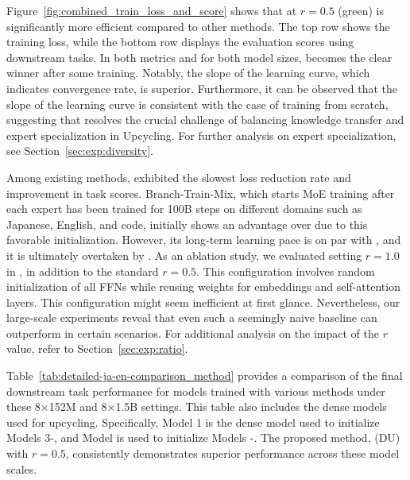 Figure~\ref{fig:combined_train_loss_and_score} shows that \methodname{} at \( r = 0.5 \) (green) is significantly more efficient compared to other methods. The top row shows the training loss, while the bottom row displays the evaluation scores using downstream tasks. In both metrics and for both model sizes, \methodname{} becomes the clear winner after some training. Notably, the slope of the learning curve, which indicates convergence rate, is superior. Furthermore, it can be observed that the slope of the learning curve is consistent with the case of training from scratch, suggesting that \methodname{} resolves the crucial challenge of balancing knowledge transfer and expert specialization in Upcycling. For further analysis on expert specialization, see Section~\ref{sec:exp:diversity}.

Among existing methods, \NUname{} exhibited the slowest loss reduction rate and improvement in task scores. Branch-Train-Mix, which starts MoE training after each expert has been trained for 100B steps on different domains such as Japanese, English, and code, initially shows an advantage over \NUname{} due to this favorable initialization. However, its long-term learning pace is on par with \NUname{}, and it is ultimately overtaken by \methodname{}. As an ablation study, we evaluated setting \( r = 1.0 \) in \methodname{}, in addition to the standard \( r = 0.5 \). This configuration involves random initialization of all FFNs while reusing weights for embeddings and self-attention layers. This configuration might seem inefficient at first glance. Nevertheless, our large-scale experiments reveal that even such a seemingly naive baseline can outperform \NUname{} in certain scenarios. For additional analysis on the impact of the \( r \) value, refer to Section~\ref{sec:exp:ratio}.

Table~\ref{tab:detailed-ja-en-comparison_method} provides a comparison of the final downstream task performance for models trained with various methods under these 8$\times$152M and 8$\times$1.5B settings. 
This table also includes the dense models used for upcycling. Specifically, Model 1 is the dense model used to initialize Models 3-, and Model  is used to initialize Models -.
The proposed method, \methodname{} (DU) with $r=0.5$, consistently demonstrates superior performance across these model scales.












